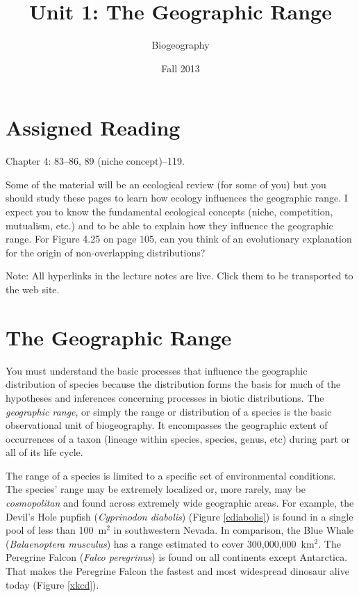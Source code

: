 \documentclass[12pt, oneside]{article}   	%
\title{Unit 1: The Geographic Range}
\author{Biogeography}
\date{Fall 2013}							%
\begin{document}
\maketitle
\section{Assigned Reading}
Chapter 4: 83--86, 89 (niche concept)--119. 

Some of the material will be an ecological review (for some of you) but you should study these pages to learn how ecology influences the geographic range.  I expect you to know the fundamental ecological concepts (niche, competition, mutualism, etc.) and to be able to explain how they influence the geographic range.  For Figure 4.25 on page 105, can you think of an evolutionary explanation for the origin of non-overlapping distributions?

Note: All hyperlinks in the lecture notes are live. Click them to be transported to the web site.

\section{The Geographic Range}

You must understand the basic processes that influence the geographic distribution of species because the distribution forms the basis for much of the hypotheses and inferences concerning processes in biotic distributions. The \emph{geographic range}, or simply the range or distribution of a species is the basic observational unit of biogeography. It encompasses the geographic extent of occurrences of a taxon (lineage within species, species, genus, etc) during part or all of its life cycle. 

The range of a species is limited to a specific set of environmental conditions. The species' range may be  extremely localized or, more rarely, may be \emph{cosmopolitan} and found across extremely wide geographic areas. For example, the Devil's Hole pupfish (\emph {Cyprinodon diabolis}) (Figure \ref{cdiabolis}) is found in a single pool of less than 100~m$^2$ in southwestern Nevada. In comparison, the Blue Whale (\emph{Balaenoptera musculus}) has a range estimated to cover 300,000,000~km$^2$.  The Peregrine Falcon (\emph{Falco peregrinus}) is found on all continents except Antarctica. That makes the Peregrine Falcon  the fastest and most widespread dinosaur alive today (Figure \ref{xkcd}).
\end{document}
